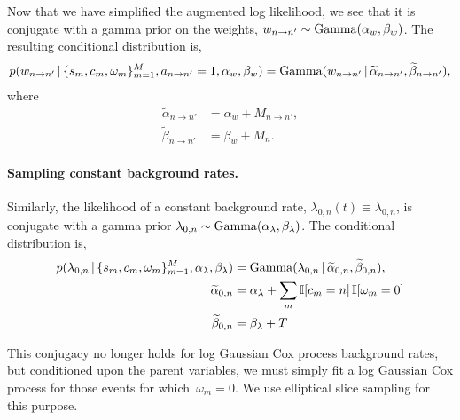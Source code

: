 Now that we have simplified the augmented log likelihood, we see that it is
conjugate with a gamma prior on the weights,
${w_{n \to n'}\sim \mathrm{Gamma}(\alpha_w, \beta_w})$.
The resulting conditional distribution is,
\begin{multline*}
  p(w_{n \to n'}\,|\, \{s_m,c_m,\omega_m\}_{m=1}^M, a_{n\to n'}=1, \alpha_w, \beta_w)
  = 
  \mathrm{Gamma}(w_{n \to n'} \,|\, \widetilde{\alpha}_{n \to n'}, \widetilde{\beta}_{n \to n'}),
\end{multline*}
where
\begin{align*}
  \widetilde{\alpha}_{n \to n'} &= \alpha_w + M_{n \to n'}, \\
  \widetilde{\beta}_{n \to n'} &= \beta_w + M_n.
\end{align*}


\paragraph{Sampling constant background rates.}
Similarly, the likelihood of a constant background rate,
${\lambda_{0,n}(t)\equiv\lambda_{0,n}}$, is conjugate with a gamma
prior ${\lambda_{0,n} \sim
  \mathrm{Gamma}(\alpha_{\lambda},\beta_{\lambda})}$.  The conditional
distribution is,
\begin{align*}
  p(\lambda_{0,n} \,|\, \{s_m,c_m, \omega_m\}_{m=1}^M, \alpha_\lambda, \beta_\lambda)
  &=
  \mathrm{Gamma}(\lambda_{0,n} \,|\, \widetilde{\alpha}_{0,n},  \widetilde{\beta}_{0,n}),\\
  \widetilde{\alpha}_{0,n} &= \alpha_{\lambda} + \sum_m \mathbb{I}[c_m = n] \, \mathbb{I}[\omega_m=0] \\
  \widetilde{\beta}_{0,n} &= \beta_\lambda + T
\end{align*}

This conjugacy no longer holds for log Gaussian Cox process background
rates, but conditioned upon the parent variables, we must simply fit a
log Gaussian Cox process for those events for which~${\omega_m=0}$. We use
elliptical slice sampling \cite{Murray-2010} for this purpose.

